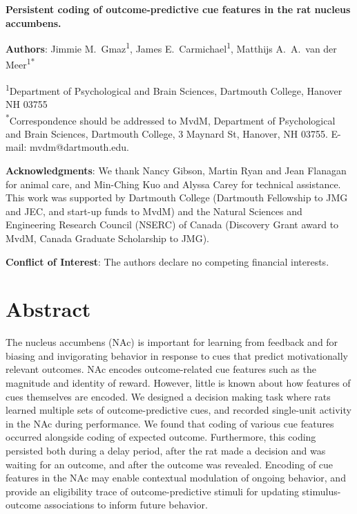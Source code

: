 \documentclass[11pt]{article}
\begin{document}
\renewcommand{\BBAB}{\BBAA}

{\Large\bf Persistent coding of outcome-predictive cue features in the
  rat nucleus accumbens.}

{\bf Authors}: Jimmie M.\ Gmaz\textsuperscript{1}, James
E.\ Carmichael\textsuperscript{1}, Matthijs A.\ A.\ van der
Meer\textsuperscript{1*}

\textsuperscript{1}Department of Psychological and Brain Sciences,
Dartmouth College, Hanover NH
03755\\ 

\textsuperscript{*}Correspondence should be addressed to MvdM,
Department of Psychological and Brain Sciences, Dartmouth College, 3
Maynard St, Hanover, NH 03755. E-mail: {\sffamily mvdm@dartmouth.edu}.

\textbf{Acknowledgments}: We thank Nancy Gibson, Martin Ryan and Jean
Flanagan for animal care, and Min-Ching Kuo and
Alyssa Carey for technical assistance. This work was supported by
Dartmouth College (Dartmouth Fellowship to JMG and JEC, and start-up funds to
MvdM) and the Natural Sciences and Engineering Research Council
(NSERC) of Canada (Discovery Grant award to MvdM, Canada Graduate
Scholarship to JMG).

\textbf{Conflict of Interest}: The authors declare no competing
financial interests.\\

\newpage
\linenumbers

\section*{Abstract}

The nucleus accumbens (NAc) is important for learning from feedback
and for biasing and invigorating behavior in response to cues that
predict motivationally relevant outcomes. NAc encodes outcome-related
cue features such as the magnitude and identity of reward. However,
little is known about how features of cues themselves are encoded.
We designed a decision making task where rats learned multiple sets of
outcome-predictive cues, and recorded single-unit activity in the NAc
during performance. We found that coding of various cue features
occurred alongside coding of expected outcome. Furthermore, this
coding persisted both during a delay period, after the rat made a
decision and was waiting for an outcome, and after the outcome was
revealed. Encoding of cue features in the NAc may enable contextual
modulation of ongoing behavior, and provide an eligibility trace of
outcome-predictive stimuli for updating stimulus-outcome associations
to inform future behavior.
\end{document}
